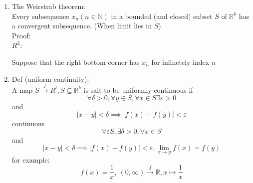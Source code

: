 \documentclass[../main.tex]{subfiles}
\begin{document}
\begin{enumerate}
\begin{itemize}
  which contradicts the definition of $B_\varepsilon(p)$.\\
  Proof by contradiction.\\
  Suppose that $S$ is not closed, then $R^k / S$ is not open in $\mathbb{R}^k$, 
  $\implies \exists p \in \mathbb{R}^k / S, \forall r> 0, B_r(p) \nsubseteq R^{k} / S$\\
  ($\implies B_r(p) \cap S \neq \emptyset$)
\end{itemize}
\item The Weirstrab theorem:\\
Every subsequence $x_n(n \in \mathbb{N})$ in a bounded (and closed) subset $S$ of $\mathbb{R}^k$ 
has a convergent subsequence. (When limit lies in $S$)\\
Proof:\\
$R^2$:
\begin{figure}[H]
  \centering
{}
\end{figure}
Suppose that the right bottom corner has $x_n$ for infinetely index $n$
\item Def (uniform continuity):\\
A map $S \xrightarrow{f} R^l, S \subseteq \mathbb{R}^k$ is sait to be uniformly continuous if
\begin{equation}
\forall \delta > 0, \forall y \in S, \forall x \in S \exists \varepsilon > 0
\end{equation}
and
\begin{equation}
\left| x - y \right| < \delta \implies \left|
f(x) - f(y)
\right| < \varepsilon
\end{equation}
continuous
\begin{equation}
\forall \varepsilon S, \exists \delta > 0, \forall x \in S
\end{equation}
and
\begin{equation}
\left| x- y\right| < \delta \implies \left| f(x) -f(y) \right| < \varepsilon, \lim_{x\to y} f(x) = f(y)
\end{equation}
for example:
\begin{equation}
f(x) = \frac{1}{x},~ (0, \infty) \xrightarrow{f} \mathbb{R}, x \mapsto \frac{1}{x}
\end{equation}

\end{enumerate}
\end{document}
